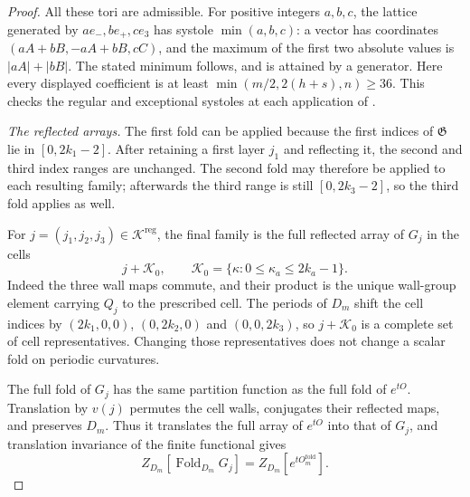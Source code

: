\documentclass[11pt,letterpaper,reqno]{amsart}
\begin{document}
\begin{proof}
All these tori are admissible. For positive integers $a,b,c$,
the lattice generated by $ae_-,be_+,ce_3$ has systole
$\min(a,b,c)$: a vector has coordinates $(aA+bB,-aA+bB,cC)$,
and the maximum of the first two absolute values is
$|aA|+|bB|$. The stated minimum follows, and is attained by a
generator. Here every displayed coefficient is at least
$\min(m/2,2(h+s),n)\ge36$. This checks the regular and exceptional
systoles at each application of .

\emph{The reflected arrays.}
The first fold can be applied because the first indices of
$\mathfrak G$ lie in $[0,2k_1-2]$. After retaining a first layer
$j_1$ and reflecting it, the second and third index ranges are
unchanged. The second fold may therefore be applied to each
resulting family; afterwards the third range is still
$[0,2k_3-2]$, so the third fold applies as well.

For $j=(j_1,j_2,j_3)\in\mathcal K^{\mathrm{reg}}$, the final
family is the full reflected array of $G_j$ in the cells
\[
 j+\mathcal K_0,\qquad
 \mathcal K_0=\{\kappa:0\le\kappa_a\le2k_a-1\}.
\]
Indeed the three wall maps commute, and their product is the
unique wall-group element carrying $Q_j$ to the prescribed cell.
The periods of $D_m$ shift the cell indices by
$(2k_1,0,0)$, $(0,2k_2,0)$ and $(0,0,2k_3)$, so
$j+\mathcal K_0$ is a complete set of cell representatives.
Changing those representatives does not change a scalar fold on
periodic curvatures.

The full fold of $G_j$ has the same partition function as the full
fold of $e^{tO}$. Translation by $v(j)$ permutes the cell walls,
conjugates their reflected maps, and preserves $D_m$. Thus it
translates the full array of $e^{tO}$ into that of $G_j$, and
translation invariance of the finite functional gives
\[
 Z_{D_m}[\operatorname{Fold}_{D_m}G_j]
       =Z_{D_m}[e^{tO_m^{\mathrm{fold}}}].
\]


\end{proof}
\end{document}
